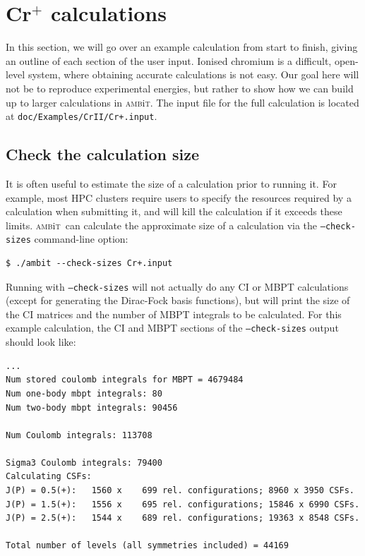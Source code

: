 \documentclass{report}
\newcommand{\ambit}{\textsc{amb}{\footnotesize i}\textsc{t}}
\begin{document}
\section{Cr$^+$ calculations}

In this section, we will go over an example calculation from start to finish, giving an outline of each
section of the user input. Ionised chromium is a difficult, open-level system, where obtaining accurate calculations is not easy. Our goal here will not be to reproduce experimental energies, but rather to show how we can build up to larger calculations in \ambit.
The input file for the full calculation is located at 
\texttt{doc/Examples/CrII/Cr+.input}.

\subsection{Check the calculation size}

It is often useful to estimate the size of a calculation prior to running it. For example, most HPC 
clusters require users to specify the resources required by a calculation when submitting it, and will
kill the calculation if it exceeds these limits. \ambit\  can calculate the approximate size of a
calculation via the \texttt{--check-sizes} command-line option:

\begin{verbatim}
$ ./ambit --check-sizes Cr+.input
\end{verbatim}

Running with \texttt{--check-sizes} will not actually do any CI or MBPT calculations (except for
generating the Dirac-Fock basis functions), but will print the size of the CI matrices and the number of
MBPT integrals to be calculated. For this example calculation, the CI and MBPT sections of the
\texttt{--check-sizes} output should look like:

\begin{verbatim}
...
Num stored coulomb integrals for MBPT = 4679484
Num one-body mbpt integrals: 80
Num two-body mbpt integrals: 90456

Num Coulomb integrals: 113708

Sigma3 Coulomb integrals: 79400
Calculating CSFs: 
J(P) = 0.5(+):   1560 x    699 rel. configurations; 8960 x 3950 CSFs.
J(P) = 1.5(+):   1556 x    695 rel. configurations; 15846 x 6990 CSFs.
J(P) = 2.5(+):   1544 x    689 rel. configurations; 19363 x 8548 CSFs.

Total number of levels (all symmetries included) = 44169
\end{verbatim}
\end{document}

